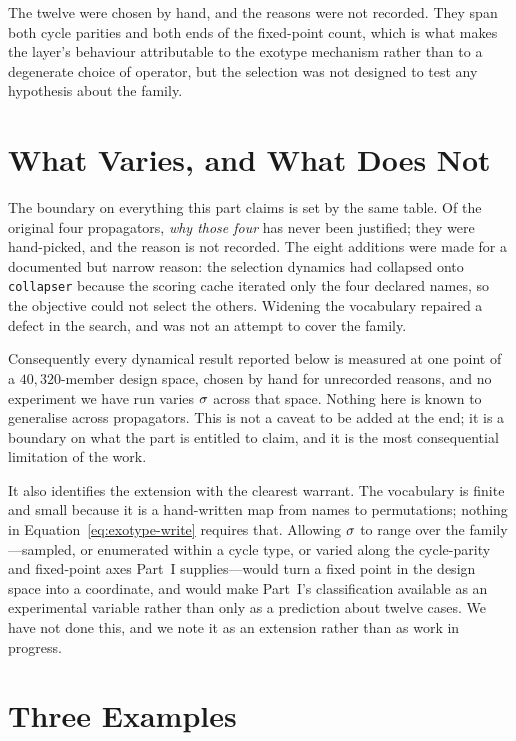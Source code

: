 The twelve were chosen by hand, and the reasons were not recorded. They span both cycle
parities and both ends of the fixed-point count, which is what makes the layer's
behaviour attributable to the exotype mechanism rather than to a degenerate choice of
operator, but the selection was not designed to test any hypothesis about the family.

\section{What Varies, and What Does Not}
\label{sec:exotype-scope}

The boundary on everything this part claims is set by the same table. Of the
original four propagators, \emph{why those four} has never been justified; they
were hand-picked, and the reason is not recorded. The eight additions were made
for a documented but narrow reason: the selection dynamics had collapsed onto
\texttt{collapser} because the scoring cache iterated only the four declared
names, so the objective could not select the others. Widening the vocabulary
repaired a defect in the search, and was not an attempt to cover the family.

Consequently every dynamical result reported below is measured at one point of a
$40{,}320$-member design space, chosen by hand for unrecorded reasons, and no
experiment we have run varies $\sigma$ across that space. Nothing here is known to
generalise across propagators. This is not a caveat to be added at the end; it
is a boundary on what the part is entitled to claim, and it is the most
consequential limitation of the work.

It also identifies the extension with the clearest warrant. The vocabulary is
finite and small because it is a hand-written map from names to permutations;
nothing in Equation~\eqref{eq:exotype-write} requires that. Allowing $\sigma$ to
range over the family---sampled, or enumerated within a cycle type, or varied
along the cycle-parity and fixed-point axes Part~I supplies---would turn a fixed
point in the design space into a coordinate, and would make Part~I's
classification available as an experimental variable rather than only as a
prediction about twelve cases. We have not done this, and we note it as an
extension rather than as work in progress.

\section{Three Examples}
\label{sec:exotype-examples}

